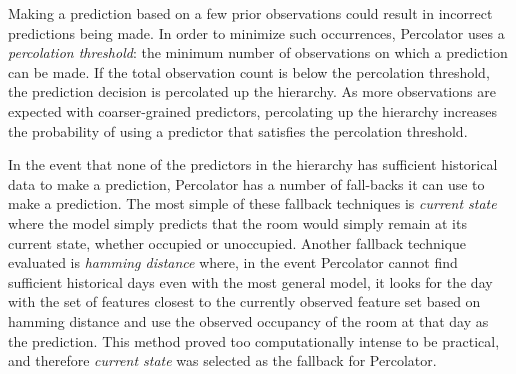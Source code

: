 Making a prediction based on a few prior observations could result in incorrect
predictions being made. In order to minimize such occurrences, Percolator uses a
{\em percolation threshold}: the minimum number of observations on which a
prediction can be made. If the total observation count is below the percolation
threshold, the prediction decision is percolated up the hierarchy. As more
observations are expected with coarser-grained predictors, percolating up the
hierarchy increases the probability of using a predictor that satisfies the
percolation threshold.

In the event that none of the predictors in the hierarchy has sufficient
historical data to make a prediction, Percolator has a number of fall-backs it
can use to make a prediction. The most simple of these fallback techniques is
{\em current state} where the model simply predicts that the room would simply
remain at its current state, whether occupied or unoccupied. Another fallback
technique evaluated is {\em hamming distance} where, in the event Percolator
cannot find sufficient historical days even with the most general model, it
looks for the day with the set of features closest to the currently observed
feature set based on hamming distance and use the observed occupancy of the room
at that day as the prediction. This method proved too computationally intense to
be practical, and therefore {\em current state} was selected as the fallback for
Percolator.


